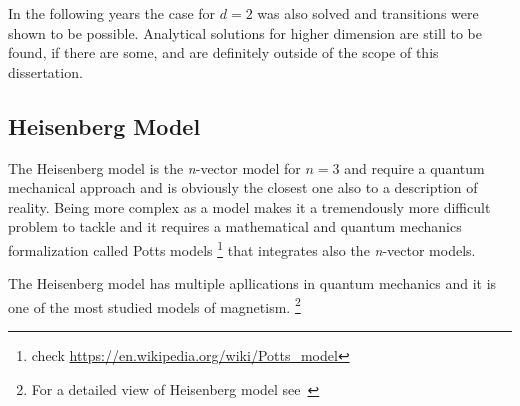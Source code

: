 In the following years the case for $d=2$ was also solved and transitions were
shown to be possible. Analytical solutions for higher dimension are still to be
found, if there are some, and are definitely outside of the scope of this
dissertation. 


\subsection{Heisenberg Model}

The Heisenberg model is the \textit{n}-vector model for $n=3$ and require a quantum
mechanical approach and is obviously the closest one also to a description of reality.
Being more complex as a model makes it a tremendously more difficult problem to 
tackle and it requires a mathematical and quantum mechanics formalization called 
Potts models \footnote{check \url{https://en.wikipedia.org/wiki/Potts_model}} that
integrates also the \textit{n}-vector models.

The Heisenberg model has multiple apllications in quantum mechanics and it is one
of the most studied models of magnetism. \footnote{For a detailed view of Heisenberg
model see~\textcite{Nolting2009}} 
